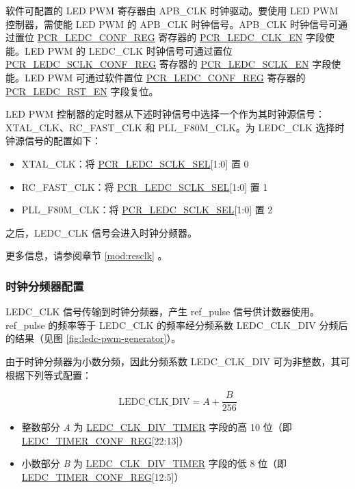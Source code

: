 \documentclass[main\_\_CN.tex]{subfiles}
\begin{document}
软件可配置的 LED PWM 寄存器由 APB\_CLK 时钟驱动。要使用 LED PWM 控制器，需使能 LED PWM 的 APB\_CLK 时钟信号。APB\_CLK 时钟信号可通过置位 \hyperref[regdesc:PCRLEDCCONFREG]{PCR\_LEDC\_CONF\_REG} 寄存器的 \hyperref[fielddesc:PCRLEDCCLKEN]{PCR\_LEDC\_CLK\_EN} 字段使能。LED PWM 的 LEDC\_CLK 时钟信号可通过置位 \hyperref[regdesc:PCRLEDCSCLKCONFREG]{PCR\_LEDC\_SCLK\_CONF\_REG} 寄存器的 \hyperref[fielddesc:PCRLEDCSCLKEN]{PCR\_LEDC\_SCLK\_EN} 字段使能。LED PWM 可通过软件置位 \hyperref[regdesc:PCRLEDCCONFREG]{PCR\_LEDC\_CONF\_REG} 寄存器的 \hyperref[fielddesc:PCRLEDCRSTEN]{PCR\_LEDC\_RST\_EN} 字段复位。

LED PWM 控制器的定时器从下述时钟信号中选择一个作为其时钟源信号：XTAL\_CLK、RC\_FAST\_CLK 和 PLL\_F80M\_CLK。为 LEDC\_CLK 选择时钟源信号的配置如下：

\begin{itemize}
    \item XTAL\_CLK：将 \hyperref[fielddesc:PCRLEDCSCLKSEL]{PCR\_LEDC\_SCLK\_SEL}[1:0] 置 0
    \item RC\_FAST\_CLK：将 \hyperref[fielddesc:PCRLEDCSCLKSEL]{PCR\_LEDC\_SCLK\_SEL}[1:0] 置 1
    \item PLL\_F80M\_CLK：将 \hyperref[fielddesc:PCRLEDCSCLKSEL]{PCR\_LEDC\_SCLK\_SEL}[1:0] 置 2
\end{itemize}

之后，LEDC\_CLK 信号会进入时钟分频器。

更多信息，请参阅章节 \ref{mod:resclk} \textit{}。

\subsubsection{时钟分频器配置}

LEDC\_CLK 信号传输到时钟分频器，产生 ref\_pulse 信号供计数器使用。ref\_pulse 的频率等于 LEDC\_CLK 的频率经分频系数 LEDC\_CLK\_DIV 分频后的结果（见图 \ref{fig:ledc-pwm-generator}）。

由于时钟分频器为小数分频，因此分频系数 LEDC\_CLK\_DIV 可为非整数，其可根据下列等式配置：

\begin{equation}
\textrm{LEDC\_CLK\_DIV} = A + \frac{B}{256}
\end{equation}

\begin{itemize}
    \item 整数部分 \textit{A} 为 \hyperref[fielddesc:LEDCCLKDIVTIMERN]{LEDC\_CLK\_DIV\_TIMER} 字段的高 10 位（即 \hyperref[regdesc:LEDCTIMERNCONFREG]{LEDC\_TIMER\_CONF\_REG}[22:13]）
    \item 小数部分 \textit{B} 为 \hyperref[fielddesc:LEDCCLKDIVTIMERN]{LEDC\_CLK\_DIV\_TIMER} 字段的低 8 位（即 \hyperref[regdesc:LEDCTIMERNCONFREG]{LEDC\_TIMER\_CONF\_REG}[12:5]）
\end{itemize}
\end{document}
